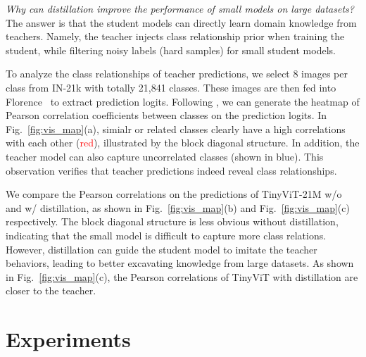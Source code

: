 \documentclass[runningheads]{llncs}
\begin{document}
\begin{figure*}[t]
    \begin{minipage}[b]{1.0\textwidth}
    \end{minipage}
\caption {Pearson correlations of output predictions  on ImageNet-21k.}
    \vspace{-4mm}
    \label {fig:vis_map}
\end{figure*}


\textit{Why can distillation improve the performance of small models on large datasets?} The answer is that the student models can directly learn domain knowledge from teachers. Namely, the teacher injects class relationship prior when training the student, while filtering noisy labels (hard samples) for small student models. 

To analyze the class relationships of teacher predictions, 
we select 8 images per class from IN-21k with totally 21,841 classes. These images are then fed into Florence~\cite{florence} to extract prediction logits. Following \cite{understandKD}, we can generate the heatmap of Pearson correlation coefficients between classes on the prediction logits.
In Fig.~\ref{fig:vis_map}(a), simialr or related classes clearly have a high correlations with each other (\textcolor{red}{red}), illustrated by the block diagonal structure. In addition, the teacher model can also capture uncorrelated classes (shown in \textcolor{light_blue}{blue}). This observation verifies that teacher predictions indeed reveal class relationships.

We compare the Pearson correlations on the predictions of TinyViT-21M w/o and w/ distillation, as shown in Fig.~\ref{fig:vis_map}(b) and Fig.~\ref{fig:vis_map}(c) respectively. The block diagonal structure is less obvious without distillation, indicating that the small model is difficult to capture more class relations. However, distillation can guide the student model to imitate the teacher behaviors, leading to better excavating knowledge from large datasets. As shown in Fig.~\ref{fig:vis_map}(c), the Pearson correlations of TinyViT with distillation are closer to the teacher. 

\vspace{-3mm}
\section{Experiments}
\vspace{-2mm}
\end{document}
